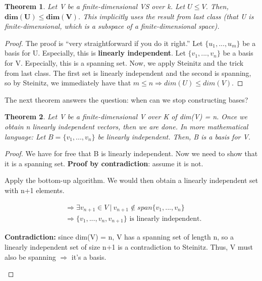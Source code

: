 \documentclass[a4paper, 12pt]{article}
\newtheorem{theorem}{Theorem}
\theoremstyle{definition}
\theoremstyle{definition}
\theoremstyle{definition}
\theoremstyle{definition}
\newenvironment{itemize_tight}{
	\begin{itemize}
		\setlength{\itemsep}{0pt}
		\setlength{\parskip}{0pt}
	}{\end{itemize}}
\begin{document}
{\begin{theorem}
	Let V be a finite-dimensional VS over k. Let $U \leq V$. Then, $\mathbf{dim(U) \leq dim(V)}$. This implicitly uses the result from last class (that U is finite-dimensional, which is a subspace of a finite-dimensional space). 
\end{theorem}
\begin{proof}
	The proof is ``very straightforward if you do it right.'' \newline \newline 
	Let $\{ u_1, ..., u_m \}$ be a basis for U. Especially, this is \textbf{linearly independent}. \newline
	Let $\{v_1,...,v_n \}$ be a basis for V. Especially, this is a spanning set. 
	\newline 
	\newline
	Now, we apply Steinitz and the trick from last class. The first set is linearly independent and the second is spanning, so by Steinitz, we immediately have that $m \leq  n \Rightarrow dim(U) \leq dim(V)$. 
\end{proof}
The next theorem answers the question: when can we stop constructing bases? 
\begin{theorem}
	Let V be a finite-dimensional V over K of dim(V) = n. Once we obtain n linearly independent vectors, then we are done. In more mathematical language: Let $B = \{ v_1, ..., v_n \}$ be linearly independent. Then, B is a basis for V. 
\end{theorem}
\begin{proof}
	We have for free that B is linearly independent. Now we need to show that it is a spanning set. \textbf{Proof by contradiction}: assume it is not. 
	\begin{itemize_tight}
		\item Apply the bottom-up algorithm. We would then obtain a linearly independent set with n+1 elements. 
	\end{itemize_tight}
\begin{align*}  
		& \Rightarrow \exists v_{n+1} \in V\ |\ v_{n+1} \notin span \{v_1,...,v_n \} \\
		& \Rightarrow \{ v_1, ..., v_n, v_{n+1} \} \mbox{ is linearly independent. }
\end{align*} 
\begin{itemize_tight}
	\item \textbf{Contradiction:} since dim(V) = n, V has a spanning set of length n, so a linearly independent set of size n+1 is a contradiction to Steinitz. Thus, V must also be spanning $\Rightarrow$ it's a basis. 
\end{itemize_tight}
\end{proof}

}
\end{document}
